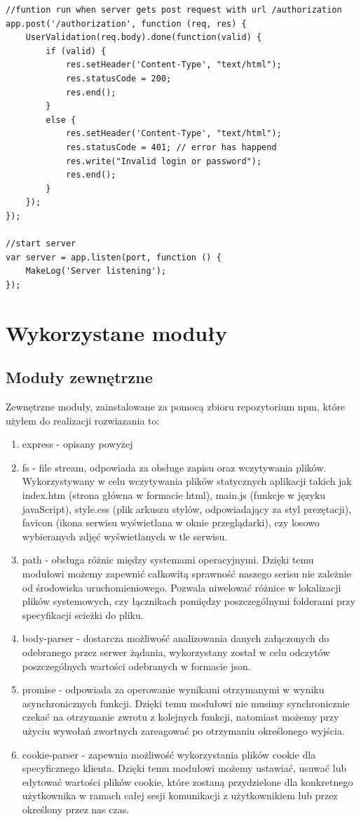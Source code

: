 \documentclass[12pt]{report}
\begin{document}
\begin{lstlisting}
//funtion run when server gets post request with url /authorization
app.post('/authorization', function (req, res) {
	UserValidation(req.body).done(function(valid) {
	    if (valid) {
	  	    res.setHeader('Content-Type', "text/html");
			res.statusCode = 200;
			res.end();
	   	}
        else {
            res.setHeader('Content-Type', "text/html");
			res.statusCode = 401; // error has happend
			res.write("Invalid login or password");
			res.end();
		}
    });
});

//start server
var server = app.listen(port, function () {
	MakeLog('Server listening');
});
\end{lstlisting}

\section{Wykorzystane moduły}

\subsection{Moduły zewnętrzne}
Zewnętrzne moduły, zainstalowane za pomocą zbioru repozytorium npm, które użyłem do realizacji rozwiazania to:
\begin{enumerate}
\item express - opisany powyżej
\item fs - file stream, odpowiada za obsługe zapisu oraz wczytywania plików. 
Wykorzystywany w celu wczytywania plików statycznych aplikacji takich jak index.htm (strona główna w formacie html), main.js (funkcje w języku javaScript), style.css (plik arkuszu stylów, odpowiadający za styl prezętacji), favicon (ikona serwisu wyświetlana w oknie przeglądarki), czy losowo wybieranych zdjęć wyświetlanych w tle serwisu.
\item path - obsługa różnic między systemami operacyjnymi. 
Dzięki temu modułowi możemy zapewnić całkowitą sprawność naszego serisu nie zależnie od środowiska uruchomieniowego. 
Pozwala niwelować różnice w lokalizacji plików systemowych, czy łącznikach pomiędzy poszczególnymi folderami przy specyfikacji scieżki do pliku.
\item body-parser - dostarcza możliwość analizowania danych załączonych do odebranego przez serwer żądania, wykorzystany został w celu odczytów poszczególnych wartości odebranych w formacie json.
\item promise - odpowiada za operowanie wynikami otrzymanymi w wyniku asynchronicznych funkcji. 
Dzięki temu modułowi nie musimy synchronicznie czekać na otrzymanie zwrotu z kolejnych funkcji, natomiast możemy przy użyciu wywołań zwortnych zareagować po otrzymaniu określonego wyjścia.
\item cookie-parser - zapewnia możliwość wykorzystania plików cookie dla specyficznego klienta. 
Dzięki temu modułowi możemy ustawiać, usuwać lub edytować wartości plików cookie, które zostaną przydzielone dla konkretnego użytkownika w ramach całej sesji komunikacji z użytkownikiem lub przez określony przez nas czas. 
\end{enumerate}
\end{document}
